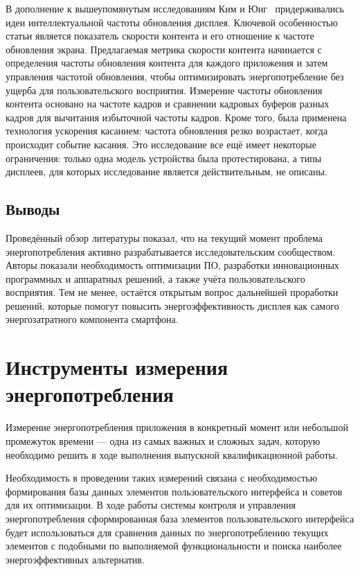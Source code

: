 \documentclass[a4paper,14pt]{extarticle} %
\begin{document}
	В дополнение к вышеупомянутым исследованиям Ким и Юнг~\parencite{kim2014content} придерживались идеи интеллектуальной частоты обновления дисплея. Ключевой особенностью статьи является показатель скорости контента и его отношение к частоте обновления экрана. Предлагаемая метрика скорости контента начинается с определения частоты обновления контента для каждого приложения и затем управления частотой обновления, чтобы оптимизировать энергопотребление без ущерба для пользовательского восприятия. Измерение частоты обновления контента основано на частоте кадров и сравнении кадровых буферов разных кадров для вычитания избыточной частоты кадров. Кроме того, была применена технология ускорения касанием: частота обновления резко возрастает, когда происходит событие касания. Это исследование все ещё имеет некоторые ограничения: только одна модель устройства была протестирована, а типы дисплеев, для которых исследование является действительным, не описаны.
	
	\subsection{Выводы}
	
	Проведённый обзор литературы показал, что на текущий момент проблема энергопотребления активно разрабатывается исследовательским сообществом. Авторы показали необходимость оптимизации ПО, разработки инновационных программных и аппаратных решений, а также учёта пользовательского восприятия. Тем не менее, остаётся открытым вопрос дальнейшей проработки решений, которые помогут повысить энергоэффективность дисплея как самого энергозатратного компонента смартфона.
	
	\newpage
	\section{Инструменты измерения энергопотребления}
	
	Измерение энергопотребления приложения в конкретный момент или небольшой промежуток времени --- одна из самых важных и сложных задач, которую необходимо решить в ходе выполнения выпускной квалификационной работы.
	
	Необходимость в проведении таких измерений связана с необходимостью формирования базы данных элементов пользовательского интерфейса и советов для их оптимизации. В ходе работы системы контроля и управления энергопотребления сформированная база элементов пользовательского интерфейса будет использоваться для сравнения данных по энергопотреблению текущих элементов с подобными по выполняемой функциональности и поиска наиболее энергоэффективных альтернатив.
	
\end{document}
